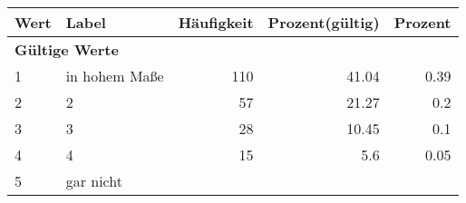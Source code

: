      \begin{longtable}{lXrrr}
     \toprule
     \textbf{Wert} & \textbf{Label} & \textbf{Häufigkeit} & \textbf{Prozent(gültig)} & \textbf{Prozent} \\
     \endhead
     \midrule
     \multicolumn{5}{l}{\textbf{Gültige Werte}}\\

     1 &
     \multicolumn{1}{X}{ in hohem Maße   } &


       \num{110} &
       \num[round-mode=places,round-precision=2]{41.04} &
         \num[round-mode=places,round-precision=2]{0.39} \\

     2 &
     \multicolumn{1}{X}{ 2   } &


       \num{57} &
       \num[round-mode=places,round-precision=2]{21.27} &
         \num[round-mode=places,round-precision=2]{0.2} \\

     3 &
     \multicolumn{1}{X}{ 3   } &


       \num{28} &
       \num[round-mode=places,round-precision=2]{10.45} &
         \num[round-mode=places,round-precision=2]{0.1} \\

     4 &
     \multicolumn{1}{X}{ 4   } &


       \num{15} &
       \num[round-mode=places,round-precision=2]{5.6} &
         \num[round-mode=places,round-precision=2]{0.05} \\

     5 &
     \multicolumn{1}{X}{ gar nicht   } &



\end{longtable}
